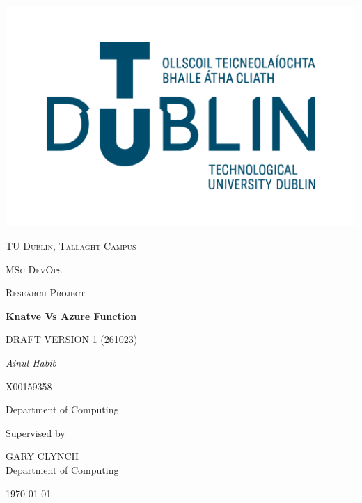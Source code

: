 \documentclass{article}
\begin{document}
\thispagestyle{empty}
\setlength\headheight{0pt} 
\begin{center}

\begin{center}
\includegraphics[width=0.65\linewidth]{images/TUD_Logo.png}            
\end{center}	

        \vspace{0.25cm}
        {\scshape\LARGE TU Dublin, Tallaght Campus \par}
        \vspace{0.25cm}
        {\scshape\Large MSc DevOps\par}
        {\scshape\Large Research Project }
        \vspace{0.5cm}

        {\Large\bfseries Knatve Vs Azure Function\par}
          {\scshape\small DRAFT VERSION 1 (261023)\par}
        
        \vspace{0.5cm}
        {\Large\itshape Ainul Habib\par}
        {\scshape\small X00159358 \par}
        Department of Computing
        \vspace{0.25cm}

\vspace{1cm}
Supervised by\par
GARY CLYNCH \\
Department of Computing\par
\large
\today

\end{center}

\clearpage
\restoregeometry
\justify
\end{document}
